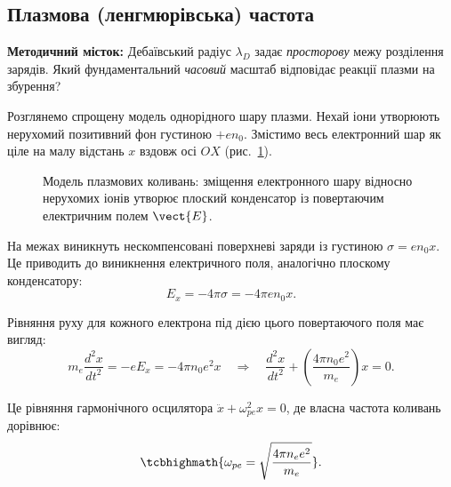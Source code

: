 \subsection{Плазмова (ленгмюрівська) частота}

\textbf{Методичний місток:} Дебаївський радіус $\lambda_D$ задає \emph{просторову} межу розділення зарядів. Який фундаментальний \emph{часовий} масштаб відповідає реакції плазми на збурення?

Розглянемо спрощену модель однорідного шару плазми. Нехай іони утворюють нерухомий позитивний фон густиною $+e n_0$. Змістимо весь електронний шар як ціле на малу відстань $x$ вздовж осі $OX$ (рис.~\ref{fig:plasma-oscillation}).

\begin{figure}[htbp]\centering
	\begin{subfigure}[t]{0.48\linewidth}\centering
	\end{subfigure}\hfill
	\begin{subfigure}[t]{0.48\linewidth}\centering
	\end{subfigure}
	\caption{Модель плазмових коливань: зміщення електронного шару відносно нерухомих іонів утворює плоский конденсатор із повертаючим електричним полем $\vect{E}$.}\label{fig:plasma-oscillation}
\end{figure}

На межах виникнуть нескомпенсовані поверхневі заряди із густиною $\sigma = e n_0 x$. Це приводить до виникнення електричного поля, аналогічно плоскому конденсатору:
\begin{equation}
	E_x = -4\pi \sigma = -4\pi e n_0 x.
\end{equation}

Рівняння руху для кожного електрона під дією цього повертаючого поля має вигляд:
\begin{equation}
	m_e \frac{d^2 x}{dt^2} = -e E_x = -4\pi n_0 e^2 x \quad \Rightarrow \quad \frac{d^2 x}{dt^2} + \left(\frac{4\pi n_0 e^2}{m_e}\right) x = 0.
\end{equation}

Це рівняння гармонічного осцилятора $\ddot{x} + \omega_{pe}^2 x = 0$, де власна частота коливань дорівнює:
\begin{equation}
	\tcbhighmath{\omega_{pe} = \sqrt{\frac{4\pi n_e e^2}{m_e}}}.
\end{equation}

